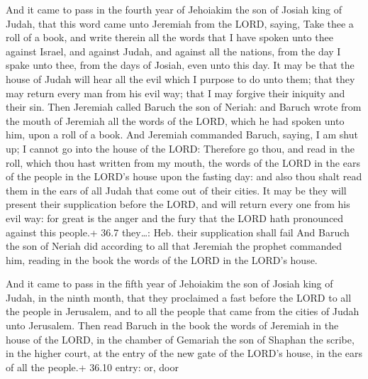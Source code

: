  And it came to pass in the fourth year of Jehoiakim the son
of Josiah king of Judah, that this word came unto Jeremiah from the
LORD, saying,  Take thee a roll of a book, and write therein
all the words that I have spoken unto thee against Israel, and against
Judah, and against all the nations, from the day I spake unto thee, from
the days of Josiah, even unto this day.  It may be that the
house of Judah will hear all the evil which I purpose to do unto them;
that they may return every man from his evil way; that I may forgive
their iniquity and their sin.  Then Jeremiah called Baruch
the son of Neriah: and Baruch wrote from the mouth of Jeremiah all the
words of the LORD, which he had spoken unto him, upon a roll of a book.
 And Jeremiah commanded Baruch, saying, I am shut up; I
cannot go into the house of the LORD:  Therefore go thou,
and read in the roll, which thou hast written from my mouth, the words
of the LORD in the ears of the people in the LORD's house upon the
fasting day: and also thou shalt read them in the ears of all Judah that
come out of their cities.  It may be they will present their
supplication before the LORD, and will return every one from his evil
way: for great is the anger and the fury that the LORD hath pronounced
against this people.+ 36.7 they\ldots: Heb. their supplication shall
fail  And Baruch the son of Neriah did according to all that
Jeremiah the prophet commanded him, reading in the book the words of the
LORD in the LORD's house.

 And it came to pass in the fifth year of Jehoiakim the son
of Josiah king of Judah, in the ninth month, that they proclaimed a fast
before the LORD to all the people in Jerusalem, and to all the people
that came from the cities of Judah unto Jerusalem.  Then
read Baruch in the book the words of Jeremiah in the house of the LORD,
in the chamber of Gemariah the son of Shaphan the scribe, in the higher
court, at the entry of the new gate of the LORD's house, in the ears of
all the people.+ 36.10 entry: or, door

